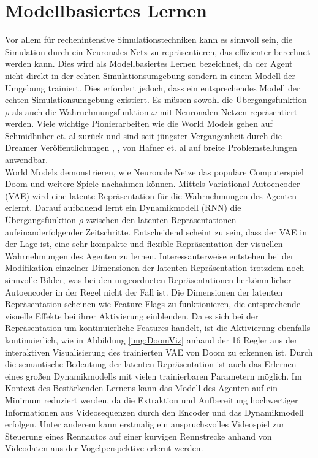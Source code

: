 \section{Modellbasiertes Lernen} \label{sec:ModelbasedLearning}
Vor allem für rechenintensive Simulationstechniken kann es sinnvoll sein, die Simulation
durch ein Neuronales Netz zu repräsentieren, das effizienter berechnet werden kann.
Dies wird als Modellbasiertes Lernen bezeichnet, da der Agent nicht direkt in der echten
Simulationsumgebung sondern in einem Modell der Umgebung trainiert. Dies erfordert jedoch,
dass ein entsprechendes Modell der echten Simulationsumgebung existiert.
Es müssen sowohl die Übergangsfunktion $\rho$ als auch die Wahrnehmungsfunktion $\omega$
mit Neuronalen Netzen repräsentiert werden. Viele wichtige Pionierarbeiten wie die World Models
\cite{NEURIPS2018_2de5d166} gehen auf Schmidhuber et. al zurück und sind seit jüngster
Vergangenheit durch die Dreamer Veröffentlichungen \cite{hafner2020dreamerv1},
\cite{hafner2022dreamerv2}, \cite{hafner2023dreamerv3} von Hafner et. al auf breite
Problemstellungen anwendbar.\\

World Models demonstrieren, wie Neuronale Netze das populäre Computerspiel Doom und weitere
Spiele nachahmen können. Mittels Variational Autoencoder (VAE) \cite{kingma2022autoencoding}
wird eine latente Repräsentation für die Wahrnehmungen
des Agenten erlernt. Darauf aufbauend lernt ein Dynamikmodell (RNN) die Übergangsfunktion
$\rho$ zwischen den latenten Repräsentationen aufeinanderfolgender Zeitschritte.
Entscheidend scheint zu sein, dass der VAE in der Lage ist, eine sehr kompakte und
flexible Repräsentation der visuellen Wahrnehmungen des Agenten zu lernen.
Interessanterweise entstehen bei der Modifikation einzelner Dimensionen der latenten
Repräsentation trotzdem noch sinnvolle Bilder, was bei den ungeordneten Repräsentationen
herkömmlicher Autoencoder in der Regel nicht der Fall ist.
Die Dimensionen der latenten Repräsentation scheinen wie Feature Flags zu funktionieren,
die entsprechende visuelle Effekte bei ihrer Aktivierung einblenden. Da es sich bei
der Repräsentation um kontinuierliche Features handelt, ist die Aktivierung ebenfalls
kontinuierlich, wie in Abbildung \ref{img:DoomViz} anhand der 16 Regler aus der
interaktiven Visualisierung des trainierten VAE von Doom zu erkennen ist.
Durch die semantische Bedeutung der latenten Repräsentation ist auch das Erlernen eines
großen Dynamikmodells mit vielen trainierbaren Parametern möglich. Im Kontext des
Bestärkenden Lernens kann das Modell des Agenten auf ein Minimum reduziert werden, da die
Extraktion und Aufbereitung hochwertiger Informationen aus Videosequenzen durch den Encoder
und das Dynamikmodell erfolgen. Unter anderem kann erstmalig ein anspruchsvolles Videospiel
zur Steuerung eines Rennautos auf einer kurvigen Rennstrecke anhand von Videodaten
aus der Vogelperspektive erlernt werden.\\

